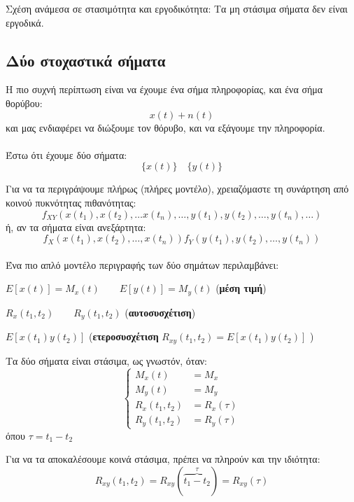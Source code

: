 \documentclass[11pt,a4paper,notitlepage,fleqn,final]{article}
\begin{document}
Σχέση ανάμεσα σε στασιμότητα και εργοδικότητα:
Τα μη στάσιμα σήματα δεν είναι εργοδικά.

\subsection{Δύο στοχαστικά σήματα}
Η πιο συχνή περίπτωση είναι να έχουμε ένα σήμα πληροφορίας, και ένα
σήμα θορύβου:
\[
x(t) + n(t)
\]
και μας ενδιαφέρει να διώξουμε τον θόρυβο, και να εξάγουμε την
πληροφορία.

\paragraph{}
Έστω ότι έχουμε δύο σήματα:
\[
\big\lbrace x(t) \big\rbrace \quad
\big\lbrace y(t) \big\rbrace
\]

Για να τα περιγράψουμε πλήρως (πλήρες μοντέλο),
χρειαζόμαστε τη συνάρτηση από κοινού πυκνότητας πιθανότητας:
\[
f_{XY} \left(
x(t_1),x(t_2),\dots x(t_n),\dots,
y(t_1),y(t_2),\dots,y(t_n),\dots
\right)
\]
ή, αν τα σήματα είναι ανεξάρτητα:
\[
f_X\left(x(t_1),x(t_2),\dots,x(t_n)\right)
f_Y\left(y(t_1),y(t_2),\dots,y(t_n)\right)
\]

\paragraph{}
Ένα πιο απλό μοντέλο περιγραφής των δύο σημάτων περιλαμβάνει:
\begin{enumroman}
	\item \( E\left[x(t)\right] = M_x(t)
	\qquad E\left[ y(t) \right] = M_y(t)
	 \) (\textbf{μέση τιμή})
	\item \( R_x(t_1,t_2)\qquad R_y(t_1,t_2) \)
	(\textbf{αυτοσυσχέτιση})
	\item \( E\left[x(t_1)y(t_2)\right] \)
	(\textbf{ετεροσυσχέτιση} \( R_{xy}(t_1,t_2)=
	E\left[x(t_1)y(t_2)\right] \) )
\end{enumroman}

Τα δύο σήματα είναι στάσιμα, ως γνωστόν, όταν:
\[
\begin{cases}
M_x(t) &= M_x \\
M_y(t) &= M_y \\
R_x(t_1,t_2) &= R_x(\tau) \\
R_y(t_1,t_2) &= R_y(\tau)
\end{cases}
\]
όπου \( \tau = t_1-t_2 \)

Για να τα αποκαλέσουμε κοινά στάσιμα, πρέπει να πληρούν και την ιδιότητα:
\[
R_{xy}(t_1,t_2) = R_{xy}(\overbrace{t_1-t_2}^{\tau}) = R_{xy}(\tau)
\]
\end{document}
